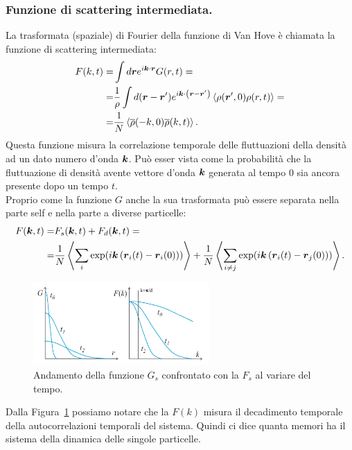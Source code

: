 \subsubsection{Funzione di scattering intermediata.}
\label{subsubsec:Fonzione di }
La trasformata (spaziale) di Fourier della funzione di Van Hove è chiamata la funzione di scattering intermediata:
\[\begin{aligned}
	F(k,t) 
	=&
	\int d\boldsymbol{r}e^{i\boldsymbol{k}\cdot\boldsymbol{r}}G(r,t) =\\
	=&
	\frac{1}{\rho }\int d(\boldsymbol{r}-\boldsymbol{r}')e^{i\boldsymbol{k}\cdot\left( \boldsymbol{r}-\boldsymbol{r}' \right) }
	\left<\rho (\boldsymbol{r}',0)\rho (r,t) \right> =\\
	=&
	\frac{1}{N}\left<\overline{\rho}(-k,0)\overline{\rho}(k,t)\right>
.\end{aligned}\]
Questa funzione misura la correlazione temporale delle fluttuazioni della densità ad un dato numero d'onda $\boldsymbol{k}$. Può esser vista come la probabilità che la fluttuazione di densità avente vettore d'onda $\boldsymbol{k}$ generata al tempo 0 sia ancora presente dopo un tempo $t$.\\
Proprio come la funzione $G$ anche la sua trasformata può essere separata nella parte self e nella parte a diverse particelle:
\[\begin{aligned}
	F(\boldsymbol{k},t) 
	=&
	F_s(\boldsymbol{k},t) + F_d(\boldsymbol{k},t) =\\
	=&
	\frac{1}{N}
	\left<\sum_{i}^{} \exp(i\boldsymbol{k}\left( \boldsymbol{r}_i(t)-\boldsymbol{r}_i(0)\right) ) \right>
	+ \frac{1}{N}
	\left<\sum_{i\neq j}^{} \exp(i\boldsymbol{k}\left( \boldsymbol{r}_i(t)-\boldsymbol{r}_j(0) \right) ) \right>
.\end{aligned}\]
\begin{figure}[ht]
	\centering
	\includegraphics[width=0.6\textwidth]{figures/Gs-Fs.png}
	\caption{Andamento della funzione $G_s$ confrontato con la $F_s$ al variare del tempo.}
	\label{fig:figures-Gs-Fs-png}
\end{figure}
Dalla Figura~\ref{fig:figures-Gs-Fs-png} possiamo notare che la $F(k)$ misura il decadimento temporale della autocorrelazioni temporali del sistema. Quindi ci dice quanta memori ha il sistema della dinamica delle singole particelle.\\
